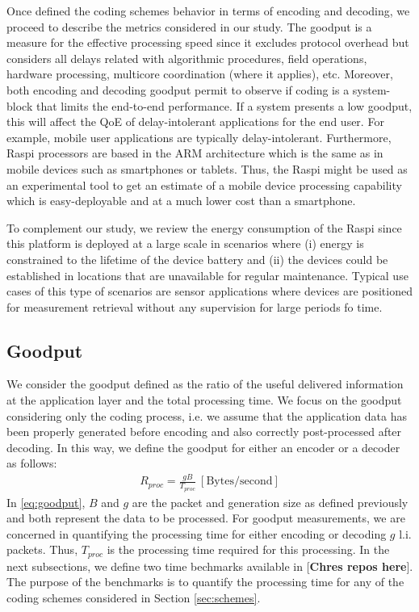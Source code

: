 \label{sec:metrics}

Once defined the coding schemes behavior in terms of encoding
and decoding, we proceed to describe the metrics considered in our study.
The goodput is a measure for the effective processing speed since it
excludes protocol overhead but considers all delays related with
algorithmic procedures, field operations, hardware processing, multicore
coordination (where it applies), etc. Moreover, both encoding and decoding
goodput permit to observe if coding is a system-block that limits the
end-to-end performance. If a system presents a low goodput, this will
affect the \ac{QoE} of delay-intolerant applications for the end user.
For example, mobile user applications are typically delay-intolerant.
Furthermore, \ac{Raspi} processors are based in the \ac{ARM} architecture
which is the same as in mobile devices such as smartphones or tablets.
Thus, the \ac{Raspi} might be used as an experimental tool to get an
estimate of a mobile device processing capability which is easy-deployable
and at a much lower cost than a smartphone.

To complement our study, we review the energy consumption of the \ac{Raspi}
since this platform is deployed at a large scale in scenarios where (i)
energy is constrained to the lifetime of the device battery and (ii) the
devices could be established in locations that are unavailable for
regular maintenance. Typical use cases of this type of scenarios are
sensor applications where devices are positioned for measurement retrieval
without any supervision for large periods fo time.

\subsection{Goodput}
We consider the goodput defined as the ratio of the useful delivered
information at the application layer and the total processing time. We focus
on the goodput considering only the coding process, i.e. we assume that
the application data has been properly generated before encoding and
also correctly post-processed after decoding. In this way, we define
the goodput for either an encoder or a decoder as follows:
%
\begin{align} \label{eq:goodput}
R_{proc} = \frac{gB}{T_{proc}} ~ [\mathrm{Bytes/second}]
\end{align}
%
In \eqref{eq:goodput}, $B$ and $g$ are the packet and generation size
as defined previously and both represent the data to be processed. For
goodput measurements, we are concerned in quantifying the processing time
for either encoding or decoding $g$ \ac{l.i.} packets. Thus, $T_{proc}$ is
the processing time required for this processing. In the next subsections, we
define two time bechmarks available in [\textbf{Chres repos here}].
The purpose of the benchmarks is to quantify the processing time for
any of the coding schemes considered in Section \ref{sec:schemes}.

